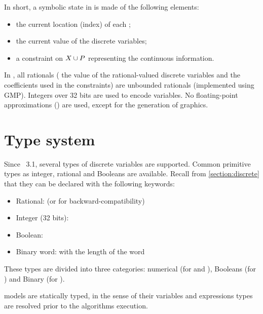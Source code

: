 
In short, a symbolic state in \imitator{} is made of the following elements:
\begin{itemize}
	\item the current location (index) of each \IPTA{};
	\item the current value of the discrete variables;
	\item a constraint on $X \cup P$ representing the continuous information.
\end{itemize}
In \imitator{}, all rationals (\ie{} the value of the rational-valued discrete variables and the coefficients used in the constraints) are unbounded rationals (implemented using GMP).
Integers over 32 bits are used to encode  variables.
No floating-point approximations () are used, except for the generation of graphics.


\section{Type system}\label{section:type_system}

Since \imitator{}~3.1, several types of discrete variables are supported.
Common primitive types as integer, rational and Booleans are available.
Recall from \cref{section:discrete} that they can be declared with the following keywords:

\begin{itemize}
	\item Rational:  (or  for backward-compatibility)
	\item Integer (32 bits): 
	\item Boolean: 
	\item Binary word:  with  the length of the word
\end{itemize}

These types are divided into three categories: numerical (for  and ), Booleans (for ) and Binary (for ).

\imitator{} models are statically typed, in the sense of their variables and expressions types are resolved prior to the algorithms execution.


